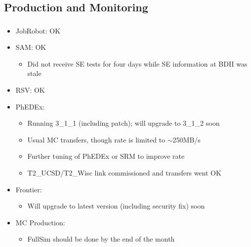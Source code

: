 \documentclass{beamer}
\newcommand{\ca}{\ensuremath{\sim}}
\begin{document}
\subsection{Production and Monitoring}
\begin{frame}
\frametitle{}
\begin{itemize}
     \item JobRobot: OK
     \item SAM: OK
     \begin{itemize}
        \item Did not receive SE tests for four days while SE information at BDII was stale
     \end{itemize}
     \item RSV: OK
     \item PhEDEx:
     \begin{itemize}
        \item Running 3\_1\_1 (including patch); will upgrade to 3\_1\_2 soon
        \item Usual MC transfers, though rate is limited to \ca{}250MB/s
        \item Further tuning of PhEDEx or SRM to improve rate
        \item T2\_UCSD/T2\_Wisc link commissioned and transfers went OK
     \end{itemize}
     \item Frontier:
     \begin{itemize}
        \item Will upgrade to latest version (including security fix) soon
    \end{itemize}
     \item MC Production:
     \begin{itemize}
        \item FullSim should be done by the end of the month
     \end{itemize}
\end{itemize}
\end{frame}
\end{document}
